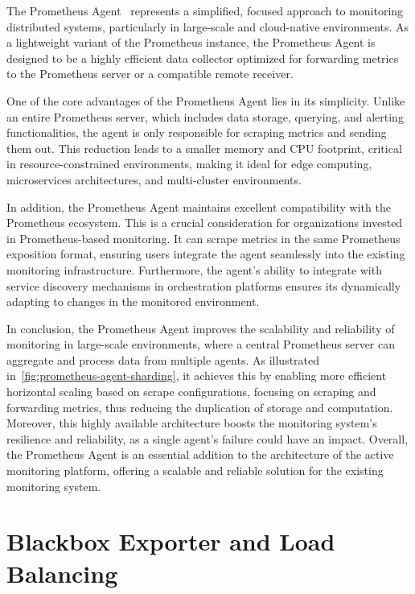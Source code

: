The Prometheus Agent~\parencite{PrometheusAgentSupport} represents a simplified, focused approach to monitoring distributed systems, particularly in large-scale and cloud-native environments. As a lightweight variant of the Prometheus instance, the Prometheus Agent is designed to be a highly efficient data collector optimized for forwarding metrics to the Prometheus server or a compatible remote receiver. 

One of the core advantages of the Prometheus Agent lies in its simplicity. Unlike an entire Prometheus server, which includes data storage, querying, and alerting functionalities, the agent is only responsible for scraping metrics and sending them out. This reduction leads to a smaller memory and CPU footprint, critical in resource-constrained environments, making it ideal for edge computing, microservices architectures, and multi-cluster environments. 

In addition, the Prometheus Agent maintains excellent compatibility with the Prometheus ecosystem. This is a crucial consideration for organizations invested in Prometheus-based monitoring. It can scrape metrics in the same Prometheus exposition format, ensuring users integrate the agent seamlessly into the existing monitoring infrastructure. Furthermore, the agent's ability to integrate with service discovery mechanisms in orchestration platforms ensures its dynamically adapting to changes in the monitored environment. 

In conclusion, the Prometheus Agent improves the scalability and reliability of monitoring in large-scale environments, where a central Prometheus server can aggregate and process data from multiple agents. As illustrated in~\autoref{fig:prometheus-agent-sharding}, it achieves this by enabling more efficient horizontal scaling based on scrape configurations, focusing on scraping and forwarding metrics, thus reducing the duplication of storage and computation. Moreover, this highly available architecture boosts the monitoring system's resilience and reliability, as a single agent's failure could have an impact. Overall, the Prometheus Agent is an essential addition to the architecture of the active monitoring platform, offering a scalable and reliable solution for the existing monitoring system. 

\section{Blackbox Exporter and Load Balancing}

